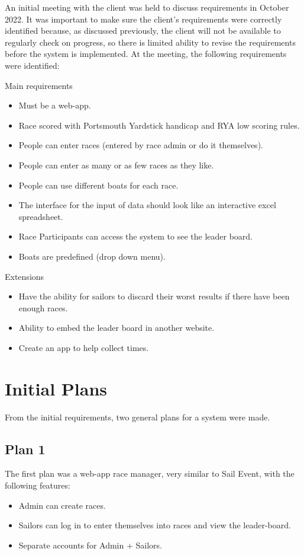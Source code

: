 \documentclass{l4proj}
\begin{document}
An initial meeting with the client was held to discuss requirements in October 2022. It was important to make sure the client’s requirements were correctly identified because, as discussed previously, the client will not be available to regularly check on progress, so there is limited ability to revise the requirements before the system is implemented.  At the meeting, the following requirements were identified:

Main requirements
\begin{itemize}
    \item
    Must be a web-app.
    \item
    Race scored with Portsmouth Yardstick handicap and RYA low scoring rules.
    \item
    People can enter races (entered by race admin or do it themselves).
    \item
    People can enter as many or as few races as they like.
    \item
    People can use different boats for each race.
    \item
    The interface for the input of data should look like an interactive excel spreadsheet.
    \item
    Race Participants can access the system to see the leader board.
    \item
    Boats are predefined (drop down menu).
\end{itemize}
Extensions
\begin{itemize}
    \item
    Have the ability for sailors to discard their worst results if there have been enough races.
    \item
    Ability to embed  the leader board in another website.
    \item
    Create an app to help collect times.
\end{itemize}

\section{Initial Plans}
From the initial requirements, two general plans for a system were made.
\subsection{Plan 1}
The first plan was a web-app race manager, very similar to Sail Event, with the following features:
\begin{itemize}
    \item
    Admin can create races.
    \item
    Sailors can log in to enter themselves into races and view the leader-board.
    \item
    Separate accounts for Admin + Sailors.
\end{itemize}
\end{document}
